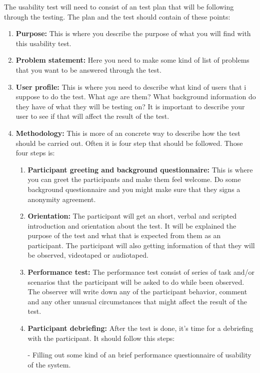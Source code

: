 The usability test will need to consist of an test plan that will be following through the testing. The plan and the test should contain of these points:\cite{usability-testing}%
\begin{enumerate}
  \item \textbf{Purpose:} This is where you describe the purpose of what you will find with this usability test.
  \item \textbf{Problem statement:} Here you need to make some kind of list of problems that you want to be answered through the test.
  \item \textbf{User profile:} This is where you need to describe what kind of users that i suppose to do  the test. What age are them? What background information do they have of what they will be testing on? It is important to describe your user to see if that will affect the result of the test.
  \item \textbf{Methodology:} This is more of an concrete way to describe how the test should be carried out. Often it is four step that should be followed. Those four steps is: 
  \begin{enumerate}
  \item \textbf{Participant greeting and background questionnaire:} This is where you can greet the participants and make them feel welcome. Do some background questionnaire and you might make sure that they signs a anonymity agreement.
  
  \item \textbf{Orientation:} The participant will get an short, verbal and scripted introduction and orientation about the test.
  It will be explained the purpose of the test and what that is expected from them as an participant. The participant will also getting information of that they will be observed, videotaped or audiotaped.
  
  \item \textbf{Performance test:} The performance test consist of series of task and/or scenarios that the participant will be asked to do while been observed. The observer will write down any of the participant behavior, comment and any other unusual circumstances that might affect the result of the test.       
  
  \item \textbf{Participant debriefing:} After the test is done, it's time for a debriefing with the participant. It should follow this steps:
  
  - Filling out some kind of an brief performance questionnaire of usability of the system. 
  

\end{enumerate}
\end{enumerate}
